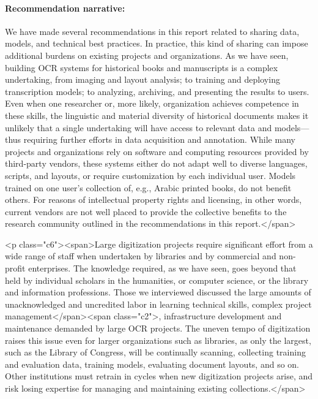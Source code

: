 \documentclass[twoside,11pt]{report}
\begin{document}
\paragraph{Recommendation narrative:}

We have made several recommendations in this report related to sharing data, models, and technical best practices. In practice, this kind of sharing can impose additional burdens on existing projects and organizations. As we have seen, building OCR systems for historical books and manuscripts is a complex undertaking, from imaging and layout analysis; to training and deploying transcription models; to analyzing, archiving, and presenting the results to users. Even when one researcher or, more likely, organization achieves competence in these skills, the linguistic and material diversity of historical documents makes it unlikely that a single undertaking will have access to relevant data and models---thus requiring further efforts in data acquisition and annotation. While many projects and organizations rely on software and computing resources provided by third-party vendors, these systems either do not adapt well to diverse languages, scripts, and layouts, or require customization by each individual user. Models trained on one user's collection of, e.g., Arabic printed books, do not benefit others. For reasons of intellectual property rights and licensing, in other words, current vendors are not well placed to provide the collective benefits to the research community outlined in the recommendations in this report.</span>

<p class="c6"><span>Large digitization projects require significant effort from a wide range of staff when undertaken by libraries and by commercial and non-profit enterprises. The knowledge required, as we have seen, goes beyond that held by individual scholars in the humanities, or computer science, or the library and information professions. Those we interviewed discussed the large amounts of unacknowledged and uncredited labor in learning technical skills, complex project management</span><span class="c2">, infrastructure development and maintenance demanded by large OCR projects. The uneven tempo of digitization raises this issue even for larger organizations such as libraries, as only the largest, such as the Library of Congress, will be continually scanning, collecting training and evaluation data, training models, evaluating document layouts, and so on. Other institutions must retrain in cycles when new digitization projects arise, and risk losing expertise for managing and maintaining existing collections.</span>
\end{document}
